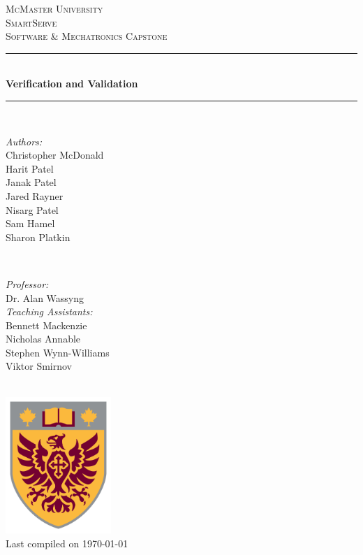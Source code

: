 \documentclass[11pt]{article}
\begin{document}
\begin{titlepage}
	\newcommand{\HRule}{\rule{\linewidth}{0.2mm}}
	\begin{center}
	\textsc{\LARGE McMaster University}\\[1.5cm]

	\textsc{\Large SmartServe}\\[0.5cm]
	\textsc{\large Software \& Mechatronics Capstone}\\[0.5cm]

	\HRule\\[0.4cm]
		{\huge\bfseries Verification and Validation}\\[0.4cm]
	\HRule\\[0.4cm]

	\begin{minipage}[t][][t]{0.5\textwidth}
		\begin{flushleft} \large
			\emph{Authors:}\\
			Christopher McDonald\\
			Harit Patel \\
			Janak Patel \\
			Jared Rayner  \\
			Nisarg Patel  \\
			Sam Hamel \\
			Sharon Platkin \\
		\end{flushleft}
	\end{minipage}
	~
	\begin{minipage}[t][][t]{0.4\textwidth}
		\begin{flushright} \large
			\emph{Professor:} \\
			Dr. Alan Wassyng \\[0.4cm]
			\emph{Teaching Assistants:} \\
			Bennett Mackenzie \\
			Nicholas Annable \\
			Stephen Wynn-Williams \\
			Viktor Smirnov
		\end{flushright}
	\end{minipage}\\[2cm]

	\includegraphics[width=0.3\textwidth]{logo.png} \\
	{\large Last compiled on \today}
	\end{center}

\end{titlepage}
\end{document}
